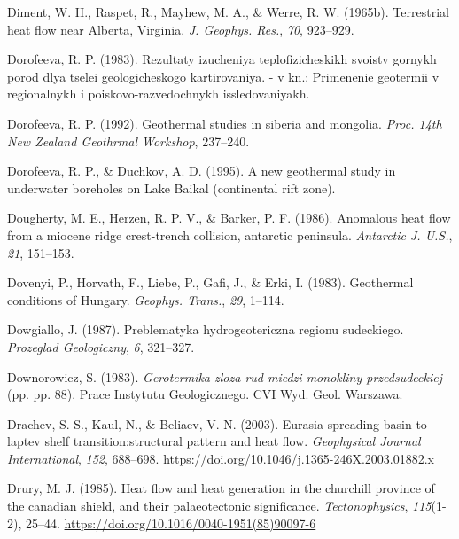 \begin{CSLReferences}{1}{1}
\leavevmode{}%
Diment, W. H., Raspet, R., Mayhew, M. A., \& Werre, R. W. (1965b). Terrestrial heat flow near {Alberta, Virginia}. \emph{J. Geophys. Res.}, \emph{70}, 923--929.

\leavevmode{}%
Dorofeeva, R. P. (1983). Rezultaty izucheniya teplofizicheskikh svoistv gornykh porod dlya tselei geologicheskogo kartirovaniya. - v kn.: Primenenie geotermii v regionalnykh i poiskovo-razvedochnykh issledovaniyakh.

\leavevmode{}%
Dorofeeva, R. P. (1992). Geothermal studies in siberia and mongolia. \emph{Proc. 14th New Zealand Geothrmal Workshop}, 237--240.

\leavevmode{}%
Dorofeeva, R. P., \& Duchkov, A. D. (1995). A new geothermal study in underwater boreholes on {Lake Baikal} (continental rift zone).

\leavevmode{}%
Dougherty, M. E., Herzen, R. P. V., \& Barker, P. F. (1986). Anomalous heat flow from a miocene ridge crest-trench collision, antarctic peninsula. \emph{Antarctic J. U.S.}, \emph{21}, 151--153.

\leavevmode{}%
Dovenyi, P., Horvath, F., Liebe, P., Gafi, J., \& Erki, I. (1983). Geothermal conditions of {Hungary}. \emph{Geophys. Trans.}, \emph{29}, 1--114.

\leavevmode{}%
Dowgiallo, J. (1987). Preblematyka hydrogeotericzna regionu sudeckiego. \emph{Prozeglad Geologiczny}, \emph{6}, 321--327.

\leavevmode{}%
Downorowicz, S. (1983). \emph{Gerotermika zloza rud miedzi monokliny przedsudeckiej} (pp. pp. 88). Prace Instytutu Geologicznego. CVI Wyd. Geol. Warszawa.

\leavevmode{}%
Drachev, S. S., Kaul, N., \& Beliaev, V. N. (2003). Eurasia spreading basin to laptev shelf transition:structural pattern and heat flow. \emph{Geophysical Journal International}, \emph{152}, 688--698. \url{https://doi.org/10.1046/j.1365-246X.2003.01882.x}

\leavevmode{}%
Drury, M. J. (1985). Heat flow and heat generation in the churchill province of the canadian shield, and their palaeotectonic significance. \emph{Tectonophysics}, \emph{115}(1-2), 25--44. \url{https://doi.org/10.1016/0040-1951(85)90097-6}


\end{CSLReferences}
